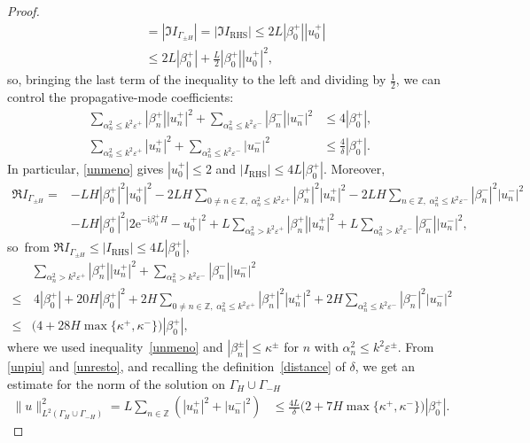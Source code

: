 \documentclass[a4paper,10pt]{article}
\newcommand{\IZ}{{\mathbb Z}}
\newcommand{\ri}{{\mathrm i}}
\newcommand{\re}{{\mathrm e}}
\newcommand{\GH}{{\Gamma_H}}
\newcommand{\GmH}{{\Gamma_{-H}}}
\newcommand{\GpmH}{{\Gamma_{\pm H}}}
\begin{document}
\begin{proof}
\begin{align*}
	& =|\Im I_\GpmH|
	=|\Im I_{\mathrm{RHS}}|
	\le 2L |\beta_0^+||u_0^+|\\
	&\le 2L|\beta_0^+|+\frac L2|\beta_0^+||u_0^+|^2,
\end{align*}
so, bringing the last term of the inequality to the left and dividing by $\frac12$, we can control the propagative-mode coefficients:
\begin{align} \label{unmeno}
	\sum_{\alpha_n^2\le k^2\varepsilon^+}|\beta_n^+||u^+_n|^2
	+\sum_{\alpha_n^2\le k^2\varepsilon^-}|\beta_n^-||u^-_n|^2
	&\le 4|\beta_0^+|,
	\\ \label{unpiu}
	\sum_{\alpha_n^2\le k^2\varepsilon^+}|u^+_n|^2
	+\sum_{\alpha_n^2\le k^2\varepsilon^-}|u^-_n|^2
	&\le \frac{4}{\delta}|\beta_0^+|.
\end{align}
In particular, \eqref{unmeno} gives $|u_0^+|\le2$ and $|I_{\mathrm{RHS}}|\le 4L|\beta_0^+|$.
Moreover,
\begin{align}\nonumber
	\Re I_\GpmH
	=&-LH|\beta_0^+|^2 |u^+_0|^2
	-2LH\sum_{0\ne n\in\IZ,\; \alpha_n^2\le k^2\varepsilon^+}|\beta_n^+|^2|u^+_n|^2 
	-2LH\sum_{n\in\IZ,\; \alpha_n^2\le k^2\varepsilon^-}|\beta_n^-|^2|u^-_n|^2  \\
	& - L H|\beta_0^+|^2\big|2\re^{-\ri\beta_0^+ H}-u^{+}_0\big|^2
	+L\sum_{\alpha^2_n > k^2\varepsilon^+} |\beta_n^+||u_n^+|^2
	+L\sum_{\alpha^2_n > k^2\varepsilon^-} |\beta_n^-||u_n^-|^2,
	\label{eq:ReIGamma}
\end{align}
so\, from $\Re I_\GpmH\le |I_{\mathrm{RHS}}| {\le  4L|\beta_0^+|}$,
\begin{align} \nonumber
	&\sum_{\alpha^2_n > k^2\varepsilon^+} |\beta_n^+||u_n^+|^2
	+\sum_{\alpha^2_n > k^2\varepsilon^-} |\beta_n^-||u_n^-|^2
	\\
	\nonumber
	\le	&  \, {4|\beta_0^+|} 
	+20H|\beta_0^+|^2 
	+2H\sum_{0\ne n\in\IZ,\; \alpha_n^2\le k^2\varepsilon^+}|\beta_n^+|^2|u^+_n|^2 
	+2H\sum_{ \alpha_n^2\le k^2\varepsilon^-}|\beta_n^-|^2|u^-_n|^2 
	\\ \label{unresto}
	\le&
	\big(4+28H\max\{\kappa^+,\kappa^-\}\big)|\beta_0^+|,
\end{align}
where we used 
inequality~\eqref{unmeno} and
$|\beta_n^\pm|\le\kappa^\pm$ 
for $n$ with $\alpha_n^2\le k^2\varepsilon^\pm$.
From \eqref{unpiu} and \eqref{unresto}, and recalling the definition~\eqref{distance} of $\delta$, we get an estimate for the norm of the solution on $\GH \cup \GmH$
\begin{align}%
	\|u\|_{L^2(\GH\cup\GmH)}^2= L
	\sum_{n\in\IZ}(|u^+_n|^2+ |u^-_n|^2)
	&\le
	{\frac{4L}\delta\big(2+7 H\max\{\kappa^+,\kappa^-\}\big)|\beta_0^+|. }

\end{align}
\end{proof}
\end{document}
